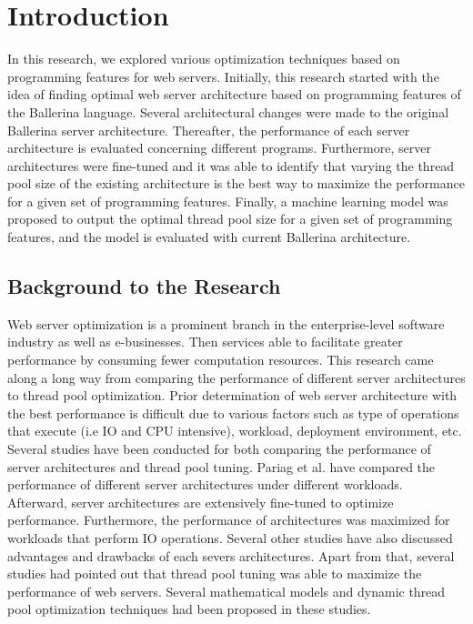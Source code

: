 \chapter{Introduction}

In this research, we explored various optimization techniques based on programming features for web servers. Initially, this research started with the idea of finding optimal web server architecture based on programming features of the Ballerina language. Several architectural changes were made to the original Ballerina server architecture. Thereafter, the performance of each server architecture is evaluated concerning different programs. Furthermore, server architectures were fine-tuned and it was able to identify that varying the thread pool size of the existing architecture is the best way to maximize the performance for a given set of programming features. Finally, a machine learning model was proposed to output the optimal thread pool size for a given set of programming features, and the model is evaluated with current Ballerina architecture.

\section{Background to the Research}

Web server optimization is a prominent branch in the enterprise-level software industry as well as e-businesses. Then services able to facilitate greater performance by consuming fewer computation resources. This research came along a long way from comparing the performance of different server architectures to thread pool optimization.  
Prior determination of web server architecture with the best performance is difficult due to various factors such as type of operations that execute (i.e IO and CPU intensive), workload, deployment environment, etc. Several studies have been conducted for both comparing the performance of server architectures and thread pool tuning. Pariag et al. \cite{comp_ac} have compared the performance of different server architectures under different workloads. Afterward, server architectures are extensively fine-tuned to optimize performance. Furthermore, the performance of architectures was maximized for workloads that perform IO operations. Several other studies have also discussed \cite{seda,events_are_bad,edprs} advantages and drawbacks of each severs architectures. Apart from that, several studies had pointed out that thread pool tuning was able to maximize the performance of web servers. Several mathematical models \cite{xu2004performance,thread_pool_analysis,math_aproach_thread_pool_tuning,syer2011identifying,linfeng2017design} and dynamic thread pool optimization techniques \cite{lorenzon2016investigating,nieplocha2007evaluating,agrawal2006adaptive} had been proposed in these studies. 

